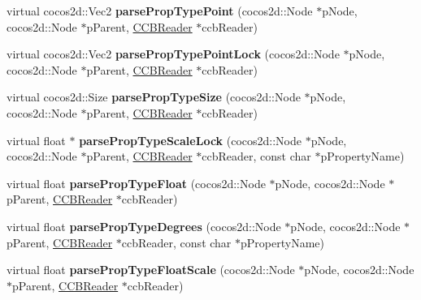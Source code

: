 \begin{DoxyCompactItemize}
virtual cocos2d\+::\+Vec2 {\bfseries parse\+Prop\+Type\+Point} (cocos2d\+::\+Node $\ast$p\+Node, cocos2d\+::\+Node $\ast$p\+Parent, \hyperlink{classcocosbuilder_1_1CCBReader}{C\+C\+B\+Reader} $\ast$ccb\+Reader)
\item 
\mbox{\label{classcocosbuilder_1_1NodeLoader_af858f588b55df102bf6dfe925e373be2}} 
virtual cocos2d\+::\+Vec2 {\bfseries parse\+Prop\+Type\+Point\+Lock} (cocos2d\+::\+Node $\ast$p\+Node, cocos2d\+::\+Node $\ast$p\+Parent, \hyperlink{classcocosbuilder_1_1CCBReader}{C\+C\+B\+Reader} $\ast$ccb\+Reader)
\item 
\mbox{\label{classcocosbuilder_1_1NodeLoader_ad4363bc01809dbc91df61497e6e2a571}} 
virtual cocos2d\+::\+Size {\bfseries parse\+Prop\+Type\+Size} (cocos2d\+::\+Node $\ast$p\+Node, cocos2d\+::\+Node $\ast$p\+Parent, \hyperlink{classcocosbuilder_1_1CCBReader}{C\+C\+B\+Reader} $\ast$ccb\+Reader)
\item 
\mbox{\label{classcocosbuilder_1_1NodeLoader_a4225c873598cc8c036ac53f6da385c8e}} 
virtual float $\ast$ {\bfseries parse\+Prop\+Type\+Scale\+Lock} (cocos2d\+::\+Node $\ast$p\+Node, cocos2d\+::\+Node $\ast$p\+Parent, \hyperlink{classcocosbuilder_1_1CCBReader}{C\+C\+B\+Reader} $\ast$ccb\+Reader, const char $\ast$p\+Property\+Name)
\item 
\mbox{\label{classcocosbuilder_1_1NodeLoader_a248b86c114f70cd099d640a669d5f699}} 
virtual float {\bfseries parse\+Prop\+Type\+Float} (cocos2d\+::\+Node $\ast$p\+Node, cocos2d\+::\+Node $\ast$p\+Parent, \hyperlink{classcocosbuilder_1_1CCBReader}{C\+C\+B\+Reader} $\ast$ccb\+Reader)
\item 
\mbox{\label{classcocosbuilder_1_1NodeLoader_a3131a61a3f36c98c7b07651c2c91ff1a}} 
virtual float {\bfseries parse\+Prop\+Type\+Degrees} (cocos2d\+::\+Node $\ast$p\+Node, cocos2d\+::\+Node $\ast$p\+Parent, \hyperlink{classcocosbuilder_1_1CCBReader}{C\+C\+B\+Reader} $\ast$ccb\+Reader, const char $\ast$p\+Property\+Name)
\item 
\mbox{\label{classcocosbuilder_1_1NodeLoader_aee35ad98cd43456684ed4887bce49e37}} 
virtual float {\bfseries parse\+Prop\+Type\+Float\+Scale} (cocos2d\+::\+Node $\ast$p\+Node, cocos2d\+::\+Node $\ast$p\+Parent, \hyperlink{classcocosbuilder_1_1CCBReader}{C\+C\+B\+Reader} $\ast$ccb\+Reader)

\end{DoxyCompactItemize}
